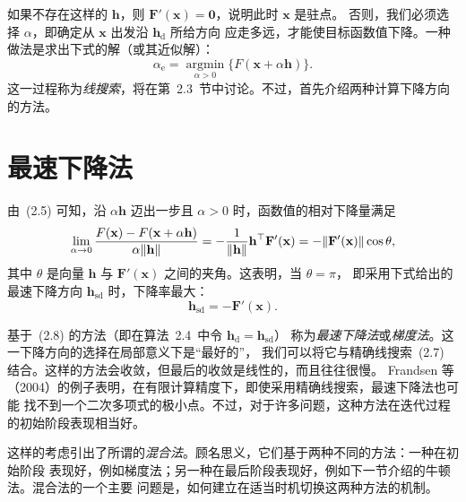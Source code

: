 如果不存在这样的 $\mathbf{h}$，则 $\mathbf{F}'(\mathbf{x})=\mathbf{0}$，说明此时 $\mathbf{x}$ 是驻点。
否则，我们必须选择 $\alpha$，即确定从 $\mathbf{x}$ 出发沿 $\mathbf{h}_{\mathrm d}$ 所给方向
应走多远，才能使目标函数值下降。一种做法是求出下式的解（或其近似解）：
\begin{equation}
  \alpha_{\mathrm e}=\operatorname*{argmin}_{\alpha>0}
       \{F(\mathbf{x}+\alpha\mathbf{h})\}.
  \tag{2.7}\label{eq:2.7}
\end{equation}
这一过程称为\emph{线搜索}，将在第~2.3~节中讨论。不过，首先介绍两种计算下降方向的方法。

\section{最速下降法}
由~(2.5) 可知，沿 $\alpha\mathbf{h}$ 迈出一步且 $\alpha>0$ 时，函数值的相对下降量满足
\[
  \lim_{\alpha\to0}
  \frac{F(\mathbf{x})-F(\mathbf{x}+\alpha\mathbf{h})}{\alpha\lVert\mathbf{h}\rVert}
  =-\frac{1}{\lVert\mathbf{h}\rVert}\mathbf{h}^{\top}\mathbf{F}'(\mathbf{x})
  =-\lVert\mathbf{F}'(\mathbf{x})\rVert\cos\theta,
\]
其中 $\theta$ 是向量 $\mathbf{h}$ 与 $\mathbf{F}'(\mathbf{x})$ 之间的夹角。这表明，当 $\theta=\pi$，
即采用下式给出的最速下降方向 $\mathbf{h}_{\mathrm{sd}}$ 时，下降率最大：
\begin{equation}
  \mathbf{h}_{\mathrm{sd}}=-\mathbf{F}'(\mathbf{x}).
  \tag{2.8}\label{eq:2.8}
\end{equation}

基于~(2.8) 的方法（即在算法~2.4~中令 $\mathbf{h}_{\mathrm d}=\mathbf{h}_{\mathrm{sd}}$）
称为\emph{最速下降法}或\emph{梯度法}。这一下降方向的选择在局部意义下是“最好的”，
我们可以将它与精确线搜索~(2.7) 结合。这样的方法会收敛，但最后的收敛是线性的，而且往往很慢。
Frandsen 等（2004）的例子表明，在有限计算精度下，即使采用精确线搜索，最速下降法也可能
找不到一个二次多项式的极小点。不过，对于许多问题，这种方法在迭代过程的初始阶段表现相当好。

这样的考虑引出了所谓的\emph{混合法}。顾名思义，它们基于两种不同的方法：一种在初始阶段
表现好，例如梯度法；另一种在最后阶段表现好，例如下一节介绍的牛顿法。混合法的一个主要
问题是，如何建立在适当时机切换这两种方法的机制。

